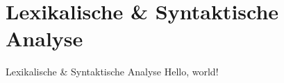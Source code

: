 \section{Lexikalische \& Syntaktische Analyse}
\begin{frame}{Lexikalische \& Syntaktische Analyse}
	Hello, world!
\end{frame}
